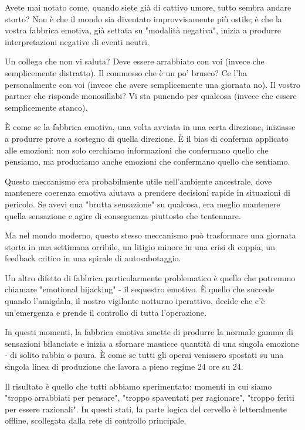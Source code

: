 Avete mai notato come, quando siete già di cattivo umore, tutto sembra andare storto? Non è che il mondo sia diventato improvvisamente più ostile; è che la vostra fabbrica emotiva, già settata su "modalità negativa", inizia a produrre interpretazioni negative di eventi neutri.

Un collega che non vi saluta? Deve essere arrabbiato con voi (invece che semplicemente distratto). Il commesso che è un po' brusco? Ce l'ha personalmente con voi (invece che avere semplicemente una giornata no). Il vostro partner che risponde monosillabi? Vi sta punendo per qualcosa (invece che essere semplicemente stanco).

È come se la fabbrica emotiva, una volta avviata in una certa direzione, iniziasse a produrre prove a sostegno di quella direzione. È il bias di conferma applicato alle emozioni: non solo cerchiamo informazioni che confermano quello che pensiamo, ma produciamo anche emozioni che confermano quello che sentiamo.

Questo meccanismo era probabilmente utile nell'ambiente ancestrale, dove mantenere coerenza emotiva aiutava a prendere decisioni rapide in situazioni di pericolo. Se avevi una "brutta sensazione" su qualcosa, era meglio mantenere quella sensazione e agire di conseguenza piuttosto che tentennare.

Ma nel mondo moderno, questo stesso meccanismo può trasformare una giornata storta in una settimana orribile, un litigio minore in una crisi di coppia, un feedback critico in una spirale di autosabotaggio.

\medskip

Un altro difetto di fabbrica particolarmente problematico è quello che potremmo chiamare "emotional hijacking" - il sequestro emotivo. È quello che succede quando l'amigdala, il nostro vigilante notturno iperattivo, decide che c'è un'emergenza e prende il controllo di tutta l'operazione.

In questi momenti, la fabbrica emotiva smette di produrre la normale gamma di sensazioni bilanciate e inizia a sfornare massicce quantità di una singola emozione - di solito rabbia o paura. È come se tutti gli operai venissero spostati su una singola linea di produzione che lavora a pieno regime 24 ore su 24.

Il risultato è quello che tutti abbiamo sperimentato: momenti in cui siamo "troppo arrabbiati per pensare", "troppo spaventati per ragionare", "troppo feriti per essere razionali". In questi stati, la parte logica del cervello è letteralmente offline, scollegata dalla rete di controllo principale.

